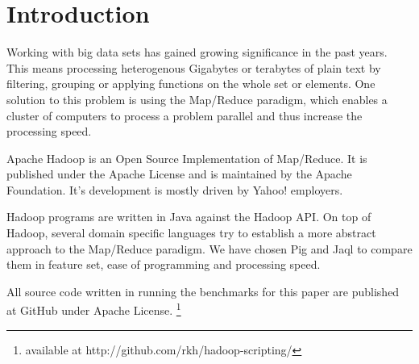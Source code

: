 \section{Introduction}

Working with big data sets has gained growing significance in the past years. This means processing heterogenous Gigabytes or terabytes of plain text by filtering, grouping or applying functions on the whole set or elements. One solution to this problem is using the Map/Reduce paradigm, which enables a cluster of computers to process a problem parallel and thus increase the processing speed.

Apache Hadoop is an Open Source Implementation of Map/Reduce. It is published under the Apache License and is maintained by the Apache Foundation. It's development is mostly driven by Yahoo! employers.

Hadoop programs are written in Java against the Hadoop API. On top of Hadoop, several domain specific languages try to establish a more abstract approach to the Map/Reduce paradigm. We have chosen Pig and Jaql to compare them in feature set, ease of programming and processing speed.

All source code written in running the benchmarks for this paper are published at GitHub under Apache License. \footnote{available at http://github.com/rkh/hadoop-scripting/}